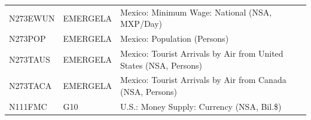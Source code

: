\documentclass[
]{book}
\begin{document}
\begin{longtable}[]{@{}lll@{}}
\begin{minipage}[t]{0.20\columnwidth}\raggedright
N273EWUN\strut
\end{minipage} & \begin{minipage}[t]{0.30\columnwidth}\raggedright
EMERGELA\strut
\end{minipage} & \begin{minipage}[t]{0.41\columnwidth}\raggedright
Mexico: Minimum Wage: National (NSA, MXP/Day)\strut
\end{minipage}\tabularnewline
\begin{minipage}[t]{0.20\columnwidth}\raggedright
N273POP\strut
\end{minipage} & \begin{minipage}[t]{0.30\columnwidth}\raggedright
EMERGELA\strut
\end{minipage} & \begin{minipage}[t]{0.41\columnwidth}\raggedright
Mexico: Population (Persons)\strut
\end{minipage}\tabularnewline
\begin{minipage}[t]{0.20\columnwidth}\raggedright
N273TAUS\strut
\end{minipage} & \begin{minipage}[t]{0.30\columnwidth}\raggedright
EMERGELA\strut
\end{minipage} & \begin{minipage}[t]{0.41\columnwidth}\raggedright
Mexico: Tourist Arrivals by Air from United States (NSA, Persons)\strut
\end{minipage}\tabularnewline
\begin{minipage}[t]{0.20\columnwidth}\raggedright
N273TACA\strut
\end{minipage} & \begin{minipage}[t]{0.30\columnwidth}\raggedright
EMERGELA\strut
\end{minipage} & \begin{minipage}[t]{0.41\columnwidth}\raggedright
Mexico: Tourist Arrivals by Air from Canada (NSA, Persons)\strut
\end{minipage}\tabularnewline
\begin{minipage}[t]{0.20\columnwidth}\raggedright
N111FMC\strut
\end{minipage} & \begin{minipage}[t]{0.30\columnwidth}\raggedright
G10\strut
\end{minipage} & \begin{minipage}[t]{0.41\columnwidth}\raggedright
U.S.: Money Supply: Currency (NSA, Bil.\$)\strut

\end{minipage}
\end{longtable}
\end{document}
